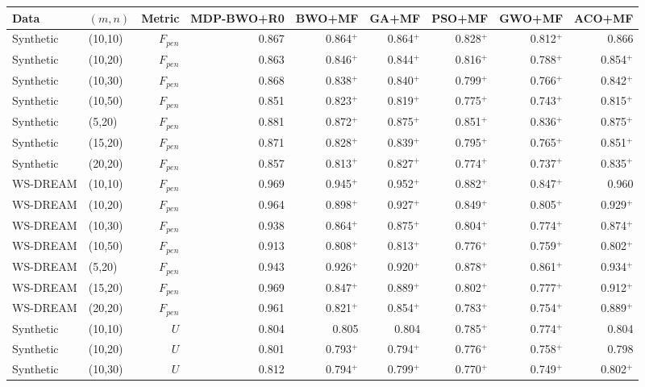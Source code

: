 \begin{tabular}{llrrrrrrr}\toprule
Data & $(m,n)$ & Metric & MDP-BWO+R0 & BWO+MF & GA+MF & PSO+MF & GWO+MF & ACO+MF\\\midrule
Synthetic & (10,10) & $F_{pen}$ & 0.867 & 0.864$^{+}$ & 0.864$^{+}$ & 0.828$^{+}$ & 0.812$^{+}$ & 0.866\\
Synthetic & (10,20) & $F_{pen}$ & 0.863 & 0.846$^{+}$ & 0.844$^{+}$ & 0.816$^{+}$ & 0.788$^{+}$ & 0.854$^{+}$\\
Synthetic & (10,30) & $F_{pen}$ & 0.868 & 0.838$^{+}$ & 0.840$^{+}$ & 0.799$^{+}$ & 0.766$^{+}$ & 0.842$^{+}$\\
Synthetic & (10,50) & $F_{pen}$ & 0.851 & 0.823$^{+}$ & 0.819$^{+}$ & 0.775$^{+}$ & 0.743$^{+}$ & 0.815$^{+}$\\
Synthetic & (5,20) & $F_{pen}$ & 0.881 & 0.872$^{+}$ & 0.875$^{+}$ & 0.851$^{+}$ & 0.836$^{+}$ & 0.875$^{+}$\\
Synthetic & (15,20) & $F_{pen}$ & 0.871 & 0.828$^{+}$ & 0.839$^{+}$ & 0.795$^{+}$ & 0.765$^{+}$ & 0.851$^{+}$\\
Synthetic & (20,20) & $F_{pen}$ & 0.857 & 0.813$^{+}$ & 0.827$^{+}$ & 0.774$^{+}$ & 0.737$^{+}$ & 0.835$^{+}$\\
WS-DREAM & (10,10) & $F_{pen}$ & 0.969 & 0.945$^{+}$ & 0.952$^{+}$ & 0.882$^{+}$ & 0.847$^{+}$ & 0.960\\
WS-DREAM & (10,20) & $F_{pen}$ & 0.964 & 0.898$^{+}$ & 0.927$^{+}$ & 0.849$^{+}$ & 0.805$^{+}$ & 0.929$^{+}$\\
WS-DREAM & (10,30) & $F_{pen}$ & 0.938 & 0.864$^{+}$ & 0.875$^{+}$ & 0.804$^{+}$ & 0.774$^{+}$ & 0.874$^{+}$\\
WS-DREAM & (10,50) & $F_{pen}$ & 0.913 & 0.808$^{+}$ & 0.813$^{+}$ & 0.776$^{+}$ & 0.759$^{+}$ & 0.802$^{+}$\\
WS-DREAM & (5,20) & $F_{pen}$ & 0.943 & 0.926$^{+}$ & 0.920$^{+}$ & 0.878$^{+}$ & 0.861$^{+}$ & 0.934$^{+}$\\
WS-DREAM & (15,20) & $F_{pen}$ & 0.969 & 0.847$^{+}$ & 0.889$^{+}$ & 0.802$^{+}$ & 0.777$^{+}$ & 0.912$^{+}$\\
WS-DREAM & (20,20) & $F_{pen}$ & 0.961 & 0.821$^{+}$ & 0.854$^{+}$ & 0.783$^{+}$ & 0.754$^{+}$ & 0.889$^{+}$\\
\midrule
Synthetic & (10,10) & $U$ & 0.804 & 0.805 & 0.804 & 0.785$^{+}$ & 0.774$^{+}$ & 0.804\\
Synthetic & (10,20) & $U$ & 0.801 & 0.793$^{+}$ & 0.794$^{+}$ & 0.776$^{+}$ & 0.758$^{+}$ & 0.798\\
Synthetic & (10,30) & $U$ & 0.812 & 0.794$^{+}$ & 0.799$^{+}$ & 0.770$^{+}$ & 0.749$^{+}$ & 0.802$^{+}$\\

\end{tabular}
